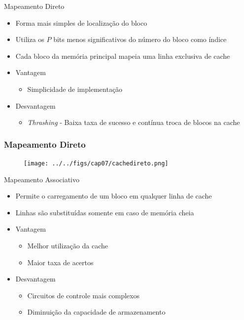 \documentclass[aspectratio=169,
				xcolor=table]{beamer}
\begin{document}
	\begin{frame}{Mapeamento Direto}
		\begin{itemize}
			\item Forma mais simples de localização do bloco
			\item Utiliza os $P$ bits menos significativos do número do bloco como índice
			\item Cada bloco da memória principal mapeia uma linha exclusiva de cache
			\item Vantagem
			\begin{itemize}
				\item Simplicidade de implementação
			\end{itemize}
			\item Desvantagem
			\begin{itemize}
				\item \textit{Thrashing} - Baixa taxa de sucesso e contínua troca de blocos na cache
			\end{itemize}
		\end{itemize}
	\end{frame}	
	
	\begin{frame}
		\frametitle{Mapeamento Direto}
		\begin{figure}[hbtp]
			\centering
			\texttt{[image: ../../figs/cap07/cachedireto.png]}
		\end{figure}		
	\end{frame}
	
	\begin{frame}{Mapeamento Associativo}
		\begin{itemize}
			\item Permite o carregamento de um bloco em qualquer linha de cache
			\item Linhas são substituídas somente em caso de memória cheia
			\item Vantagem
			\begin{itemize}
				\item Melhor utilização da cache
				\item Maior taxa de acertos
			\end{itemize}
			\item Desvantagem
			\begin{itemize}
				\item Circuitos de controle mais complexos
				\item Diminuição da capacidade de armazenamento
			\end{itemize}
		\end{itemize}
	\end{frame}
\end{document}
